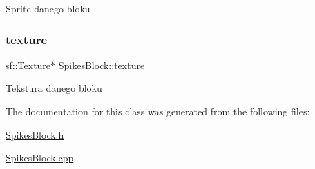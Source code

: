 Sprite danego bloku \mbox{\label{class_spikes_block_a0280cf45f757b2bf74f06394d7c51d28}} 
\subsubsection{\texorpdfstring{texture}{texture}}
{\footnotesize\ttfamily sf\+::\+Texture$\ast$ Spikes\+Block\+::texture\hspace{0.3cm}{\ttfamily [protected]}}

Tekstura danego bloku 

The documentation for this class was generated from the following files\+:\begin{DoxyCompactItemize}
\item 
\hyperlink{_spikes_block_8h}{Spikes\+Block.\+h}\item 
\hyperlink{_spikes_block_8cpp}{Spikes\+Block.\+cpp}\end{DoxyCompactItemize}
